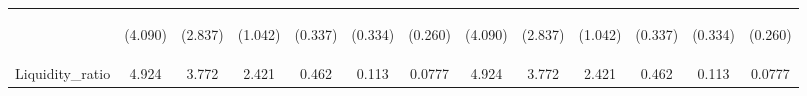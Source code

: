 \documentclass[]{article}
\begin{document}
\begin{center}
\begin{tabular}{lcccccccccccc}
\vspace{4pt} & \begin{footnotesize}(4.090)\end{footnotesize} & \begin{footnotesize}(2.837)\end{footnotesize} & \begin{footnotesize}(1.042)\end{footnotesize} & \begin{footnotesize}(0.337)\end{footnotesize} & \begin{footnotesize}(0.334)\end{footnotesize} & \begin{footnotesize}(0.260)\end{footnotesize} & \begin{footnotesize}(4.090)\end{footnotesize} & \begin{footnotesize}(2.837)\end{footnotesize} & \begin{footnotesize}(1.042)\end{footnotesize} & \begin{footnotesize}(0.337)\end{footnotesize} & \begin{footnotesize}(0.334)\end{footnotesize} & \begin{footnotesize}(0.260)\end{footnotesize} \\
Liquidity\_ratio & 4.924 & 3.772 & 2.421 & 0.462 & 0.113 & 0.0777 & 4.924 & 3.772 & 2.421 & 0.462 & 0.113 & 0.0777 \\

\end{tabular}
\end{center}
\end{document}
